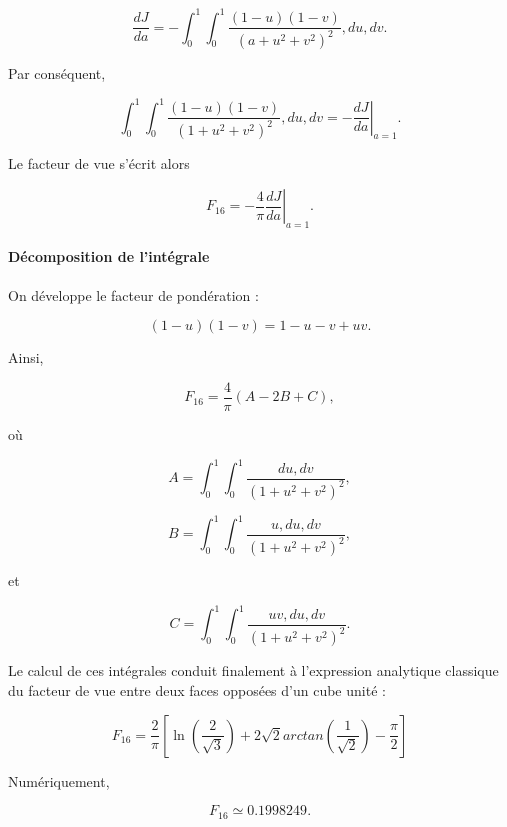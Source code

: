 \begin{equation}
\frac{dJ}{da}=-\int_0^1\int_0^1\frac{(1-u)(1-v)}{(a+u^2+v^2)^2},du,dv.
\end{equation}

Par conséquent,

\begin{equation}
\int_0^1\int_0^1\frac{(1-u)(1-v)}{(1+u^2+v^2)^2},du,dv=-\left.\frac{dJ}{da}\right|_{a=1}.
\end{equation}

Le facteur de vue s'écrit alors

\begin{equation}
F_{16}=-\frac{4}{\pi}\left.\frac{dJ}{da}\right|_{a=1}.
\end{equation}

\paragraph{Décomposition de l'intégrale}

On développe le facteur de pondération :

\begin{equation}
(1-u)(1-v)=1-u-v+uv.
\end{equation}

Ainsi,

\begin{equation}
F_{16}=\frac{4}{\pi}(A-2B+C),
\end{equation}

où

\begin{equation}
A=\int_0^1\int_0^1\frac{du,dv}{(1+u^2+v^2)^2},
\end{equation}

\begin{equation}
B=\int_0^1\int_0^1\frac{u,du,dv}{(1+u^2+v^2)^2},
\end{equation}

et

\begin{equation}
C=\int_0^1\int_0^1\frac{uv,du,dv}{(1+u^2+v^2)^2}.
\end{equation}

Le calcul de ces intégrales conduit finalement à l'expression analytique classique du facteur de vue entre deux faces opposées d'un cube unité :

\begin{equation}
F_{16}=\frac{2}{\pi} \left[ \ln(\frac{2}{\sqrt{3}}) +2\sqrt{2}arctan(\frac{1}{\sqrt{2}})-\frac{\pi}{2} \right]
\end{equation}

Numériquement,

\begin{equation}
F_{16}\simeq 0.1998249.
\end{equation}
